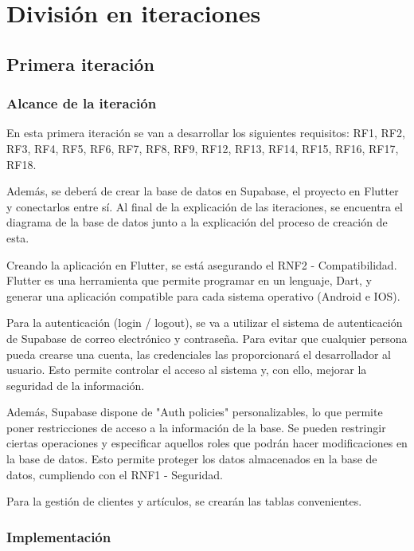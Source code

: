 \chapter{División en iteraciones}
\label{chap:iteraciones}

\section{Primera iteración}

\subsection{Alcance de la iteración}

En esta primera iteración se van a desarrollar los siguientes requisitos: RF1, RF2, RF3, RF4, RF5, RF6, RF7, RF8, RF9, RF12, RF13, RF14, RF15, RF16, RF17, RF18. 

Además, se deberá de crear la base de datos en Supabase, el proyecto en Flutter y conectarlos entre sí. Al final de la explicación de las iteraciones, se encuentra el diagrama de la base de datos junto a la explicación del proceso de creación de esta. 

Creando la aplicación en Flutter, se está asegurando el RNF2 - Compatibilidad. Flutter es una herramienta que permite programar en un lenguaje, Dart, y generar una aplicación compatible para cada sistema operativo (Android e IOS). 

Para la autenticación  (login / logout), se va a utilizar el sistema de autenticación de Supabase de correo electrónico y contraseña. Para evitar que cualquier persona pueda crearse una cuenta, las credenciales las proporcionará el desarrollador al usuario. Esto permite controlar el acceso al sistema y, con ello, mejorar la seguridad de la información. 

Además, Supabase dispone de "Auth policies" personalizables, lo que permite poner restricciones de acceso a la información de la base. Se pueden restringir ciertas operaciones y especificar aquellos roles que podrán hacer modificaciones en la base de datos. Esto permite proteger los datos almacenados en la base de datos, cumpliendo con el RNF1 - Seguridad. 

Para la gestión de clientes y artículos, se crearán las tablas convenientes. 

\subsection{Implementación}

